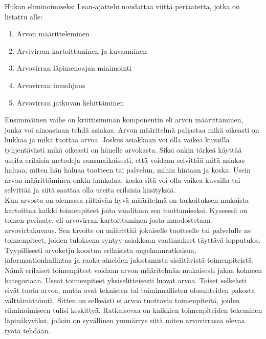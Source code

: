 \documentclass[finnish,12pt,a4paper,pdftex]{article}
\begin{document}
\noindent Hukan eliminoimiseksi Lean-ajattelu noudattaa viittä periaatetta, jotka on listattu alle:

\begin{enumerate}
\setlength{\itemsep}{0pt}
    \item Arvon määritteleminen
    \item Arvivirran kartoittaminen ja kuvaaminen
    \item Arvovirran läpimenoajan minimointi
    \item Arvovirran imuohjaus
    \item Arvovirran jatkuvan kehittäminen
\end{enumerate}

 Ensimmäinen vaihe on kriittisimmän komponentin eli arvon määrittäminen, jonka voi ainoastaan tehdä asiakas. Arvon määritelmä paljastaa mikä oikeasti on hukkaa ja mikä tuottaa arvoa. Joskus asiakkaan voi olla vaikea kuvailla tyhjentävästi mikä oikeasti on hänelle arvokasta. Siksi onkin tärkeä käyttää useita erilaisia metodeja samanaikaisesti, että voidaan selvittää mitä asiakas haluaa, miten hän haluaa tuotteen tai palvelun, mihin hintaan ja koska. Usein arvon määrittäminen onkin hankalaa, koska sitä voi olla vaikea kuvailla tai selvittää ja siitä saattaa olla useita erilaisia käsityksiä. \\

\noindent Kun arvosta on olemassa riittävän hyvä määritelmä on tarkoituksen mukaista kartoittaa kaikki toimenpiteet joita vaaditaan sen tuottamiseksi. Kyseessä on toinen periaate, eli arvovirran kartoittaminen josta muodostetaan arvovirtakuvaus. Sen tavoite on määrittää jokaiselle tuotteelle tai palvelulle ne toimenpiteet, joiden tuloksena syntyy asiakkaan vaatimukset täyttävä lopputulos. Tyypillisesti arvoketju koostuu erilaisista ongelmanratkaisua, informaationhallintaa ja raaka-aineiden jalostamista sisältävistä toimenpiteistä. Nämä erilaiset toimenpiteet voidaan arvon määritelmän mukaisesti jakaa kolmeen kategoriaan. Useat toimenpiteet yksiselitteisesti luovat arvoa. Toiset selkeästi eivät tuota arvoa, mutta ovat teknisten tai toiminnallisten olosuhteiden pakosta välttämättömiä. Sitten on selkeästi ei arvoa tuottavia toimenpiteitä, joiden eliminoimiseen tulisi keskittyä. Ratkaisevaa on kaikkien toimenpiteiden tekeminen läpinäkyväksi, jolloin on syvällinen ymmärrys siitä miten arvovirrassa olevaa työtä tehdään.\\
\end{document}
